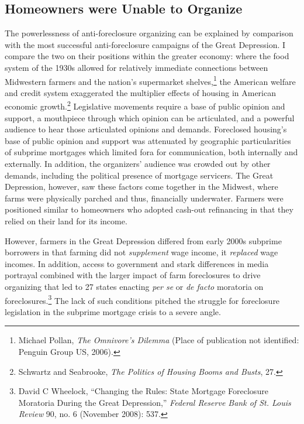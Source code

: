 \documentclass[12pt,oneside]{psthesis}
\begin{document}
\hypertarget{homeowners}{%
\subsection{Homeowners were Unable to Organize}\label{homeowners}}

The powerlessness of anti-foreclosure organizing can be explained by comparison with the most successful anti-foreclosure campaigns of the Great Depression.
I compare the two on their positions within the greater economy: where the food system of the 1930s allowed for relatively immediate connections between Midwestern farmers and the nation's supermarket shelves,\footnote{Michael Pollan, \emph{The Omnivore's Dilemma} (Place of publication not identified: Penguin Group US, 2006).} the American welfare and credit system exaggerated the multiplier effects of housing in American economic growth.\footnote{Schwartz and Seabrooke, \emph{The Politics of Housing Booms and Busts}, 27.}
Legislative movements require a base of public opinion and support, a mouthpiece through which opinion can be articulated, and a powerful audience to hear those articulated opinions and demands.
Foreclosed housing's base of public opinion and support was attenuated by geographic particularities of subprime mortgages which limited fora for communication, both internally and externally.
In addition, the organizers' audience was crowded out by other demands, including the political presence of mortgage servicers.
The Great Depression, however, saw these factors come together in the Midwest, where farms were physically parched and thus, financially underwater.
Farmers were positioned similar to homeowners who adopted cash-out refinancing in that they relied on their land for its income.

However, farmers in the Great Depression differed from early 2000s subprime borrowers in that farming did not \emph{supplement} wage income, it \emph{replaced} wage incomes.
In addition, access to government and stark differences in media portrayal combined with the larger impact of farm foreclosures to drive organizing that led to 27 states enacting \emph{per se} or \emph{de facto} moratoria on foreclosures.\footnote{David C Wheelock, ``Changing the Rules: State Mortgage Foreclosure Moratoria During the Great Depression,'' \emph{Federal Reserve Bank of St. Louis Review} 90, no. 6 (November 2008): 537.}
The lack of such conditions pitched the struggle for foreclosure legislation in the subprime mortgage crisis to a severe angle.
\end{document}
